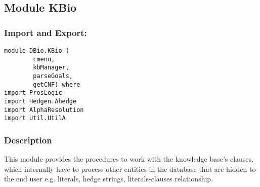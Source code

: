 \documentclass[../gr-final.tex]{subfiles}
\begin{document}
\subsection{Module KBio}
\subsubsection{Import and Export:}
\begin{lstlisting}
module DBio.KBio (
        cmenu,
        kbManager,
        parseGoals,
        getCNF) where
import ProsLogic
import Hedgen.Ahedge
import AlphaResolution
import Util.UtilA
\end{lstlisting}
\subsubsection{Description}
This module provides the procedures to work with the knowledge
base's clauses, which internally have to process other entities
in the database that are hidden to the end user e.g. literals, hedge
strings, literals-clauses relationship.
\end{document}
